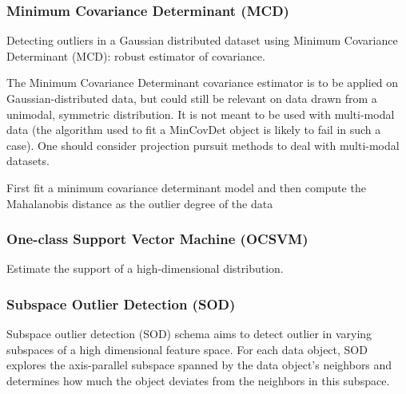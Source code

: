 \subsubsection{Minimum Covariance Determinant (MCD)}
\label{subsubsec:introduction:related-works:mcd}
Detecting outliers in a Gaussian distributed dataset using Minimum Covariance Determinant (MCD): robust estimator of covariance.

The Minimum Covariance Determinant covariance estimator is to be applied on Gaussian-distributed data, but could still be relevant on data drawn from a unimodal, symmetric distribution.
It is not meant to be used with multi-modal data (the algorithm used to fit a MinCovDet object is likely to fail in such a case).
One should consider projection pursuit methods to deal with multi-modal datasets.

First fit a minimum covariance determinant model and then compute the Mahalanobis distance as the outlier degree of the data
\cite{rousseeuw1999mcd}
\cite{hardin2004mcd}

\subsubsection{One-class Support Vector Machine (OCSVM)}
\label{subsubsec:introduction:related-works:ocsvm}
Estimate the support of a high-dimensional distribution.
\cite{sholkopf2001ocsvm}

\subsubsection{Subspace Outlier Detection (SOD)}
\label{subsubsec:introduction:related-works:sod}
Subspace outlier detection (SOD) schema aims to detect outlier in varying subspaces of a high dimensional feature space.
For each data object, SOD explores the axis-parallel subspace spanned by the data object’s neighbors and determines how much the object deviates from the neighbors in this subspace.
\cite{kriegel2009sod}

